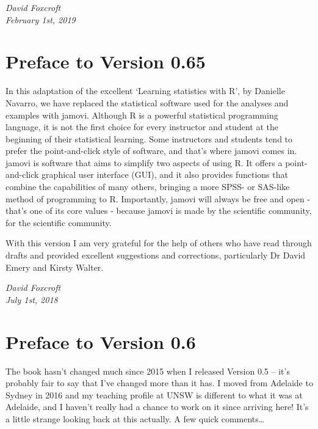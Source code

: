 \documentclass[
]{book}
\begin{document}
\emph{David Foxcroft\\
February 1st, 2019}

\hypertarget{preface-to-version-0.65}{%
\section*{Preface to Version 0.65}\label{preface-to-version-0.65}}

In this adaptation of the excellent `Learning statistics with R', by
Danielle Navarro, we have replaced the statistical software used for the
analyses and examples with jamovi. Although R is a powerful statistical
programming language, it is not the first choice for every instructor
and student at the beginning of their statistical learning. Some
instructors and students tend to prefer the point-and-click style of
software, and that's where jamovi comes in. jamovi is software that aims
to simplify two aspects of using R. It offers a point-and-click
graphical user interface (GUI), and it also provides functions that
combine the capabilities of many others, bringing a more SPSS- or
SAS-like method of programming to R. Importantly, jamovi will always be
free and open - that's one of its core values - because jamovi is made
by the scientific community, for the scientific community.

With this version I am very grateful for the help of others who have
read through drafts and provided excellent suggestions and corrections,
particularly Dr David Emery and Kirsty Walter.

\emph{David Foxcroft\\
July 1st, 2018}

\hypertarget{preface-to-version-0.6}{%
\section*{Preface to Version 0.6}\label{preface-to-version-0.6}}

The book hasn't changed much since 2015 when I released Version 0.5 --
it's probably fair to say that I've changed more than it has. I moved
from Adelaide to Sydney in 2016 and my teaching profile at UNSW is
different to what it was at Adelaide, and I haven't really had a chance
to work on it since arriving here! It's a little strange looking back at
this actually. A few quick comments\ldots{}
\end{document}
